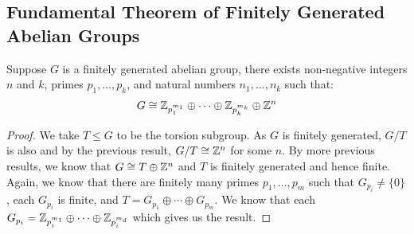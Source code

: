 \subsection{Fundamental Theorem of Finitely Generated Abelian Groups}

Suppose $G$ is a finitely generated abelian group, there exists
non-negative integers $n$ and $k$, primes $p_1, \ldots, p_k$, and
natural numbers $n_1, \ldots, n_k$ such that: \begin{align*}
    G \cong \mathbb{Z}_{p_1^{m_1}} \oplus \cdots 
    \oplus \mathbb{Z}_{p_k^{m_k}} \oplus \mathbb{Z}^n
\end{align*}

\begin{proof}
    We take $T \leq G$ to be the torsion subgroup. As $G$ is finitely generated,
    $G / T$ is also and by the previous result, $G / T \cong \mathbb{Z}^n$ for some
    $n$. By more previous results, we know that $G \cong T \oplus \mathbb{Z}^n$
    and $T$ is finitely generated and hence finite. Again, we know that
    there are finitely many primes $p_1, \ldots, p_m$ such that
    $G_{p_i} \neq \{0\}$, each $G_{p_i}$ is finite, and 
    $T = G_{p_1} \oplus \cdots \oplus G_{p_m}$. We know that each
    $G_{p_i} = \mathbb{Z}_{p_i^{m_1}} \oplus \cdots \oplus \mathbb{Z}_{p_i^{m_d}}$
    which gives us the result.
\end{proof}
